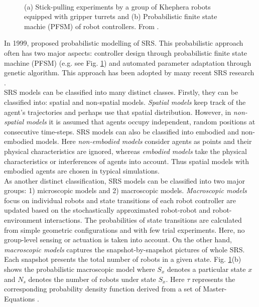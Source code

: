 \begin{figure}
\centering
{} 
\hspace{0.5cm}\\
\caption{ (a) Stick-pulling experiments by a group of Khephera robots equipped with gripper turrets and (b) Probabilistic finite state machie (PFSM) of robot controllers. From \protect{}.}
\label{fig:stick-pulling-expt}
\end{figure}
In 1999,  proposed probabilistic modelling of SRS. This probabilistic approach often has two major aspects: controller design through probabilistic finite state machine (PFSM) (e.g. see Fig. \ref{fig:stick-pulling-expt}) and automated parameter adaptation through genetic algorithm. This approach has been adopted by many recent SRS research . \\
SRS models can be classified into many distinct classes. Firstly, they can be classified into: spatial and non-spatial models. {\em Spatial models} keep track of the agent's trajectories and perhaps use that spatial distribution. However, in {\em non-spatial models} it is assumed that agents occupy independent, random positions at consecutive time-steps. SRS models can also be classified into embodied and non-embodied models. Here  {\em non-embodied models} consider agents  as points and their physical characteristics are ignored, whereas {\em embodied models} take the physical characteristics or interferences of agents into account. Thus spatial models with embodied agents are chosen in typical simulations.\\
As another distinct classification, SRS models can be classified into two major groups: 1) microscopic models and 2) macroscopic models. {\em Macroscopic models} focus on individual robots and state transitions of each robot controller are updated based on the stochastically approximated robot-robot and robot-environment interactions. The probabilities of state transitions are calculated from simple geometric configurations and with few trial experiments. Here, no group-level sensing or actuation is taken into account. On the other hand, {\em macroscopic models} captures the snapshot-by-snapshot pictures of whole SRS. Each snapshot presents the total number of robots in a given state. Fig. \ref{fig:stick-pulling-expt}(b) shows the probabilistic macroscopic model where $S_{x}$ denotes a particular state $x$ and $N_{s}$ denotes the number of robots under state $S_{x}$. Here $\tau$ represents the corresponding probability density function derived from a set of Master-Equations \cite{Agassounon+2004}.
